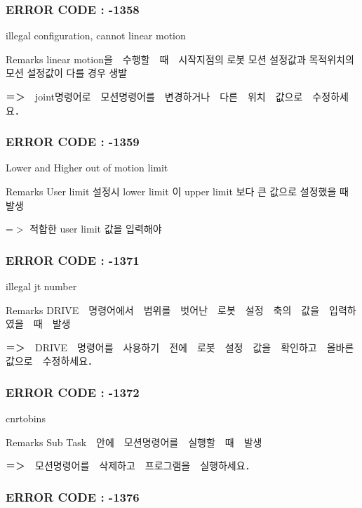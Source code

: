  \subsubsection*{E\-R\-R\-O\-R C\-O\-D\-E \-: -\/1358 }

illegal configuration, cannot linear motion \begin{DoxyRemark}{Remarks}
linear motion을　수행할　때　시작지점의 로봇 모션 설정값과 목적위치의 모션 설정값이 다를 경우 생발 \par
 ＝＞　joint명령어로　모션명령어를　변경하거나　다른　위치　값으로　수정하세요．
\end{DoxyRemark}


 \subsubsection*{E\-R\-R\-O\-R C\-O\-D\-E \-: -\/1359 }

Lower and Higher out of motion limit \begin{DoxyRemark}{Remarks}
User limit 설정시 lower limit 이 upper limit 보다 큰 값으로 설정했을 때 발생 \par
 =$>$ 적합한 user limit 값을 입력해야
\end{DoxyRemark}


 \subsubsection*{E\-R\-R\-O\-R C\-O\-D\-E \-: -\/1371 }

illegal jt number \begin{DoxyRemark}{Remarks}
D\-R\-I\-V\-E　명령어에서　범위를　벗어난　로봇　설정　축의　값을　입력하였을　때　발생 \par
 ＝＞　\-D\-R\-I\-V\-E　명령어를　사용하기　전에　로봇　설정　값을　확인하고　올바른　값으로　수정하세요．
\end{DoxyRemark}


 \subsubsection*{E\-R\-R\-O\-R C\-O\-D\-E \-: -\/1372 }

cnrtobins \begin{DoxyRemark}{Remarks}
Sub Task　안에　모션명령어를　실행할　때　발생 \par
 ＝＞　모션명령어를　삭제하고　프로그램을　실행하세요．
\end{DoxyRemark}


 \subsubsection*{E\-R\-R\-O\-R C\-O\-D\-E \-: -\/1376 }

